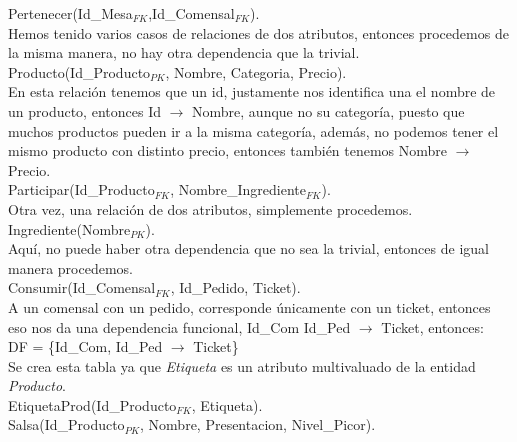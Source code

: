 \documentclass[11pt,letterpaper]{article}
\begin{document}
Pertenecer(Id\_Mesa\(_{FK}\),Id\_Comensal\(_{FK}\)).\\

Hemos tenido varios casos de relaciones de dos atributos, entonces procedemos de la misma manera, no hay otra dependencia que la trivial.\\

Producto(Id\_Producto\(_{PK}\), Nombre, Categoria, Precio).\\

En esta relación tenemos que un id, justamente nos identifica una el nombre de un producto, entonces Id \(\rightarrow\) Nombre, aunque no su categoría, puesto que muchos productos pueden ir a la misma categoría, además, no podemos tener el mismo producto con distinto precio, entonces también tenemos Nombre \(\rightarrow\) Precio.\\

Participar(Id\_Producto\(_{FK}\), Nombre\_Ingrediente\(_{FK}\)).\\

Otra vez, una relación de dos atributos, simplemente procedemos.\\

Ingrediente(Nombre\(_{PK}\)).\\

Aquí, no puede haber otra dependencia que no sea la trivial, entonces de igual manera procedemos.\\

Consumir(Id\_Comensal\(_{FK}\), Id\_Pedido, Ticket).\\

A un comensal con un pedido, corresponde únicamente con un ticket, entonces eso nos da una dependencia funcional, Id\_Com Id\_Ped \(\rightarrow\) Ticket, entonces:\\

DF = \{Id\_Com, Id\_Ped \(\rightarrow\) Ticket\}\\

Se crea esta tabla ya que \textit{Etiqueta} es un atributo multivaluado de la entidad \textit{Producto}.\\

EtiquetaProd(Id\_Producto\(_{FK}\), Etiqueta).\\


Salsa(Id\_Producto\(_{PK}\), Nombre, Presentacion, Nivel\_Picor).\\
\end{document}
